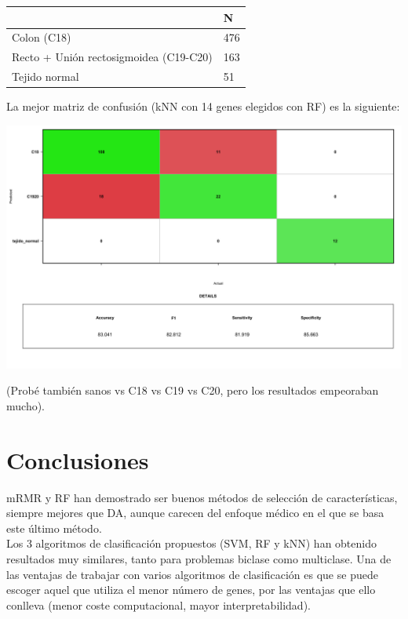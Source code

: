 \begin{table}[H]
	\centering
	\begin{tabular}{|l|l|}
		\hline
		& N   \\ \hline
		Colon (C18)    & 476 \\ \hline
		Recto + Unión rectosigmoidea (C19-C20) & 163  \\ \hline
		Tejido normal           & 51  \\ \hline
	\end{tabular}
\end{table}

La mejor matriz de confusión (kNN con 14 genes elegidos con RF) es la siguiente:

\begin{center}
	\includegraphics[width=1\textwidth]{figuras/auxiliares/cr_04_analisis_multiclase_codigo/35_knn_matriz_confusion_mejor_metodo.png} 
\end{center}

(Probé también sanos vs C18 vs C19 vs C20, pero los resultados empeoraban mucho).

\section{Conclusiones}

mRMR y RF han demostrado ser buenos métodos de selección de características, siempre mejores que DA, aunque carecen del enfoque médico en el que se basa este último método.\\

Los 3 algoritmos de clasificación propuestos (SVM, RF y kNN) han obtenido resultados muy similares, tanto para problemas biclase como multiclase. Una de las ventajas de trabajar con varios algoritmos de clasificación es que se puede escoger aquel que utiliza el menor número de genes, por las ventajas que ello conlleva (menor coste computacional, mayor interpretabilidad).\\

